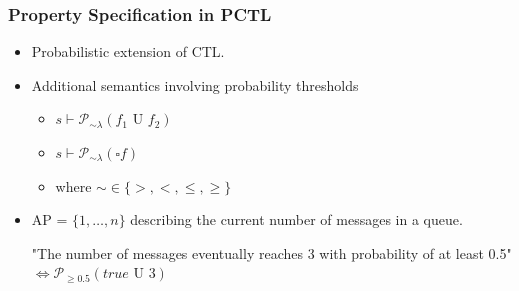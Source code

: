 \documentclass{beamer}
\theoremstyle{definition}
\begin{document}
\begin{frame}
    \frametitle{Property Specification in PCTL}

    \begin{itemize}
        \item Probabilistic extension of CTL.
        \item Additional semantics involving probability thresholds
            \begin{itemize}
                \item $ s \vdash \mathcal{P}_{\sim\lambda}(f_1 \text{ U } f_2) $
                \item $ s \vdash \mathcal{P}_{\sim\lambda}(\square f) $
                \item where $ \sim \in \{ >, <, \leq, \geq \} $
            \end{itemize}
        \item AP = $ \{ 1, \ldots, n \} $ describing the current number of
            messages in a queue.

            "The number of messages eventually reaches 3 with probability of at least 0.5"
            $ \iff \mathcal{P}_{\geq 0.5}(true \text{ U } 3) $
    \end{itemize}
\end{frame}
\end{document}

